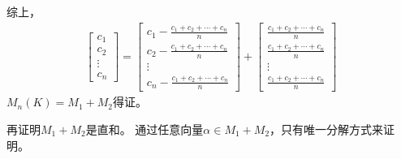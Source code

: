 \documentclass{article}
\begin{document}
\begin{itemize}
        综上，
        \begin{align*}
          \begin{bmatrix}
            c_1    \\
            c_2    \\
            \vdots \\
            c_n
          \end{bmatrix}
          = \begin{bmatrix}
              c_1 - \frac{c_1 + c_2 + \cdots + c_n}{n} \\
              c_2 - \frac{c_1 + c_2 + \cdots + c_n}{n} \\
              \vdots                                   \\
              c_n - \frac{c_1 + c_2 + \cdots + c_n}{n}
            \end{bmatrix}
          + \begin{bmatrix}
              \frac{c_1 + c_2 + \cdots + c_n}{n} \\
              \frac{c_1 + c_2 + \cdots + c_n}{n} \\
              \vdots                             \\
              \frac{c_1 + c_2 + \cdots + c_n}{n}
            \end{bmatrix}
        \end{align*}
        $M_n(K) = M_1 + M_2$得证。

        再证明$M_1 + M_2$是直和。
        通过任意向量$\alpha \in M_1 + M_2$，只有唯一分解方式来证明。


\end{itemize}
\end{document}
